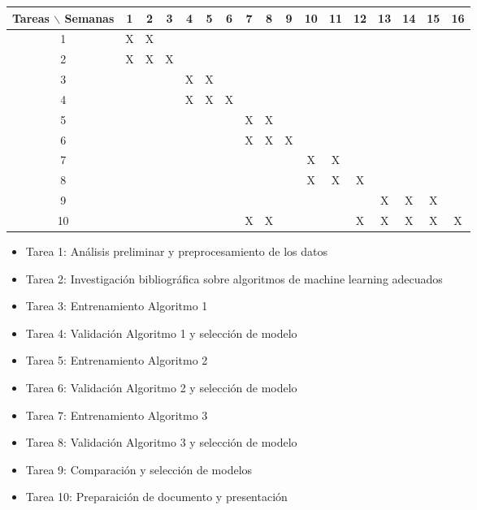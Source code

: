 \documentclass[12pt]{article}
\begin{document}
\begin{table}[htb]
	\begin{tabular}{|c|cccccccccccccccc| }
	\hline
	Tareas $\backslash$ Semanas & 1 & 2 & 3 & 4 & 5 & 6 & 7 & 8 & 9 & 10 & 11 & 12 & 13 & 14 & 15 & 16  \\
	\hline
	1 & X & X &   &   &   &   &   &  &  &   &   &   &   &   &   &   \\
	2 &  X & X & X &   &  &  &  &   &   &  &  &  &   &  &  &   \\
	3 &   &   &   & X & X  &   &   &  &   &   &   &  &   &   &  &   \\
	4 &  &  &  & X & X & X &  &  &  &  &   &   &   &   &   &   \\
	5 &  &   &   &   &  &   &  X & X  & &   &   &  &   &   &  &   \\
	6 &  &  &   &   &   &   & X  & X & X &   &   &   &   &   &   &   \\
	7 &   &  &  &   &  &  &  &   &   & X & X &  &  &  &  &   \\
	8 &   &   &   &  &   &   &   &  &   & X  &  X & X &  &   &  &   \\
	9 &  &  &  &  &  &  &  &  &  & &   &   &  X &  X & X  &   \\
	10 &   &   &   &   &  &   &  X & X  &  &   &   & X &  X & X  & X &  X \\
	\hline
	\end{tabular}
\end{table}
\vspace{1mm}

\begin{itemize}
	\item Tarea 1:  Análisis preliminar y preprocesamiento de los datos
	\item Tarea 2: Investigación bibliográfica sobre algoritmos de machine learning adecuados
	\item Tarea 3: Entrenamiento Algoritmo 1
	\item Tarea 4: Validación Algoritmo  1 y selección de modelo
	\item Tarea 5: Entrenamiento Algoritmo 2
	\item Tarea 6: Validación Algoritmo  2 y selección de modelo
	\item Tarea 7: Entrenamiento Algoritmo 3
	\item Tarea 8: Validación Algoritmo  3 y selección de modelo
	\item Tarea 9: Comparación y selección de modelos 
	\item Tarea 10: Preparaición de documento y presentación
\end{itemize}
\end{document}
